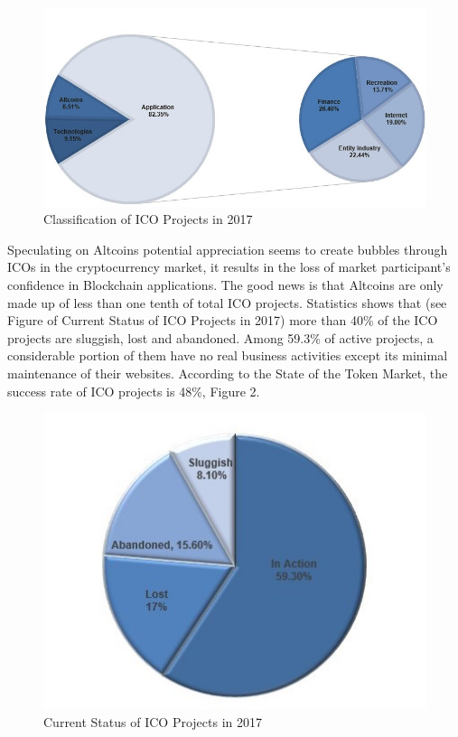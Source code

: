 \documentclass[fleqn,10pt]{SelfArx} %
\begin{document}
\begin{figure}[ht]\centering
\includegraphics[width=\linewidth]{1}
\caption{Classification of ICO Projects in 2017}
\label{1}
\end{figure}

Speculating on Altcoins potential appreciation seems to create bubbles through ICOs in the cryptocurrency market, it results in the loss of market participant’s confidence in Blockchain applications. The good news is that Altcoins are only made up of less than one tenth of total ICO projects. Statistics shows that (see Figure of Current Status of ICO Projects in 2017) more than 40\% of the ICO projects are sluggish, lost and abandoned. Among 59.3\% of active projects, a considerable portion of them have no real business activities except its minimal maintenance of their websites. According to the State of the Token Market, the success rate of ICO projects is 48\%, Figure 2.


\begin{figure}[ht]\centering
\includegraphics[width=\linewidth]{2}
\caption{Current Status of ICO Projects in 2017}
\label{2}
\end{figure}
\end{document}
